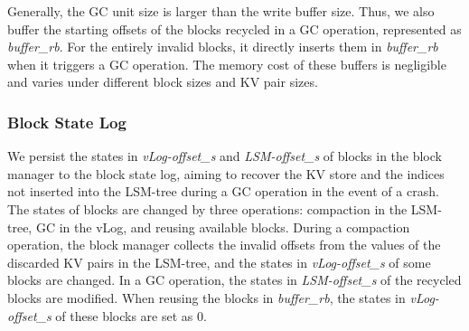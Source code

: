 \documentclass[sigconf]{acmart}
\begin{document}
Generally, the GC unit size is larger than the write buffer size. Thus, we also buffer the starting offsets of the blocks recycled in a GC operation, represented as \textit{buffer\_rb}. For the entirely invalid blocks, it directly inserts them in \textit{buffer\_rb} when it triggers a GC operation. The memory cost of these buffers is negligible and varies under different block sizes and KV pair sizes. 

\subsubsection{Block State Log}
We persist the states in \textit{vLog-offset\_s} and \textit{LSM-offset\_s} of blocks in the block manager to the block state log, aiming to recover the KV store and the indices not inserted into the LSM-tree during a GC operation in the event of a crash. The states of blocks are changed by three operations: compaction in the LSM-tree, GC in the vLog, and reusing available blocks. During a compaction operation, the block manager collects the invalid offsets from the values of the discarded KV pairs in the LSM-tree, and the states in \textit{vLog-offset\_s} of some blocks are changed. In a GC operation, the states in \textit{LSM-offset\_s} of the recycled blocks are modified. When reusing the blocks in \textit{buffer\_rb}, the states in \textit{vLog-offset\_s} of these blocks are set as 0. 

\end{document}
